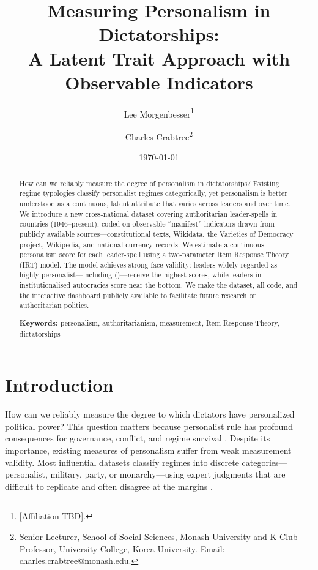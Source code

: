 \documentclass[12pt]{article}
\title{Measuring Personalism in Dictatorships:\\A Latent Trait Approach with Observable Indicators}
\author{
  Lee Morgenbesser\thanks{[Affiliation TBD].} \and
  Charles Crabtree\thanks{Senior Lecturer, School of Social Sciences, Monash University and K-Club Professor, University College, Korea University. Email: charles.crabtree@monash.edu.}
}
\date{\today}
\begin{document}
\doublespacing

\maketitle

\begin{abstract}
\noindent How can we reliably measure the degree of personalism in dictatorships? Existing regime typologies classify personalist regimes categorically, yet personalism is better understood as a continuous, latent attribute that varies across leaders and over time. We introduce a new cross-national dataset covering \nLeaders{} authoritarian leader-spells in \nCountries{} countries (1946--present), coded on \nIndicators{} observable ``manifest'' indicators drawn from publicly available sources---constitutional texts, Wikidata, the Varieties of Democracy project, Wikipedia, and national currency records. We estimate a continuous personalism score for each leader-spell using a two-parameter Item Response Theory (IRT) model. The model achieves strong face validity: leaders widely regarded as highly personalist---including \topLeader{} (\topCountry{})---receive the highest scores, while leaders in institutionalised autocracies score near the bottom. We make the dataset, all code, and the interactive dashboard publicly available to facilitate future research on authoritarian politics.

\bigskip
\noindent\textbf{Keywords:} personalism, authoritarianism, measurement, Item Response Theory, dictatorships
\end{abstract}

\newpage

\section{Introduction}

How can we reliably measure the degree to which dictators have personalized political power? This question matters because personalist rule has profound consequences for governance, conflict, and regime survival \citep{geddes2014, weeks2014, svolik2012}. Despite its importance, existing measures of personalism suffer from weak measurement validity. Most influential datasets classify regimes into discrete categories---personalist, military, party, or monarchy---using expert judgments that are difficult to replicate and often disagree at the margins \citep{geddes2014, frantz2011}.
\end{document}
